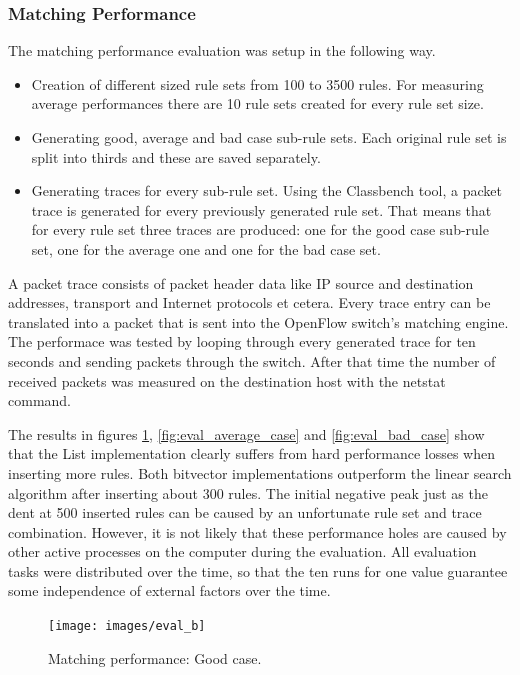 \documentclass[a4paper,
		12pt,
		parskip=full,
		titlepage
		]{scrartcl}
\begin{document}
\subsubsection{Matching Performance}
The matching performance evaluation was setup in the following way.
\begin{itemize}
    \item Creation of different sized rule sets from 100 to 3500 rules.
        For measuring average performances there are 10 rule sets created for every rule set size.
    \item Generating good, average and bad case sub-rule sets. 
        Each original rule set is split into thirds and these are saved separately.
    \item Generating traces for every sub-rule set.
        Using the Classbench\cite{classbench_website} tool, a packet trace is generated for every previously generated rule set.
        That means that for every rule set three traces are produced: 
        one for the good case sub-rule set, one for the average one and one for the bad case set.
\end{itemize}
A packet trace consists of packet header data like IP source and destination addresses, transport and Internet protocols et cetera.
Every trace entry can be translated into a packet that is sent into the OpenFlow switch's matching engine.
The performace was tested by looping through every generated trace for ten seconds and sending packets through the switch.
After that time the number of received packets was measured on the destination host with the \textsf{netstat} command.

The results in figures \ref{fig:eval_good_case}, \ref{fig:eval_average_case} and \ref{fig:eval_bad_case} show that the List implementation
clearly suffers from hard performance losses when inserting more rules.
Both bitvector implementations outperform the linear search algorithm after inserting about 300 rules.
The initial negative peak just as the dent at 500 inserted rules can be caused by an unfortunate rule set and trace combination.
However, it is not likely that these performance holes are caused by other active processes on the computer during the evaluation.
All evaluation tasks were distributed over the time, so that the ten runs 
for one value guarantee some independence of external factors over the time.

\begin{figure}
\centering
\texttt{[image: images/eval\_b]}
\caption{Matching performance: Good case.}
\label{fig:eval_good_case}
\end{figure}
\end{document}
